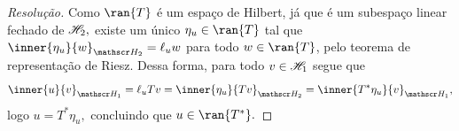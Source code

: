 \begin{proof}[Resolução]
  Como \(\ran{T}\) é um espaço de Hilbert, já que é um subespaço linear fechado de \(\mathscr{H}_2,\) existe um único \(\eta_u \in \ran{T}\) tal que \(\inner{\eta_u}{w}_{\hilbert_2} = \ell_uw\) para todo \(w\in \ran{T}\), pelo teorema de representação de Riesz. Dessa forma, para todo \(v \in \mathscr{H}_1\) segue que
  \begin{equation*}
    \inner{u}{v}_{\hilbert_1} = \ell_uTv = \inner{\eta_u}{Tv}_{\hilbert_2} = \inner{T^*\eta_u}{v}_{\hilbert_1},
  \end{equation*}
  logo \(u = T^*\eta_u,\) concluindo que \(u \in \ran{T^*}.\)
\end{proof}
